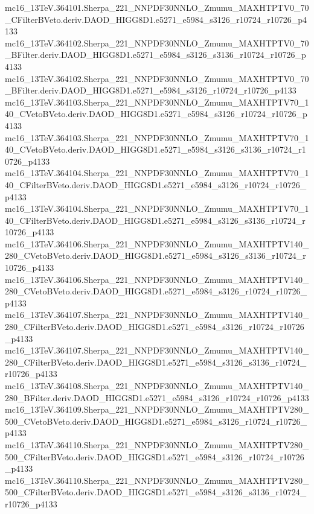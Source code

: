 mc16_13TeV.364101.Sherpa_221_NNPDF30NNLO_Zmumu_MAXHTPTV0_70_CFilterBVeto.deriv.DAOD_HIGG8D1.e5271_e5984_s3126_r10724_r10726_p4133 \\
mc16_13TeV.364102.Sherpa_221_NNPDF30NNLO_Zmumu_MAXHTPTV0_70_BFilter.deriv.DAOD_HIGG8D1.e5271_e5984_s3126_s3136_r10724_r10726_p4133 \\
mc16_13TeV.364102.Sherpa_221_NNPDF30NNLO_Zmumu_MAXHTPTV0_70_BFilter.deriv.DAOD_HIGG8D1.e5271_e5984_s3126_r10724_r10726_p4133 \\
mc16_13TeV.364103.Sherpa_221_NNPDF30NNLO_Zmumu_MAXHTPTV70_140_CVetoBVeto.deriv.DAOD_HIGG8D1.e5271_e5984_s3126_r10724_r10726_p4133 \\
mc16_13TeV.364103.Sherpa_221_NNPDF30NNLO_Zmumu_MAXHTPTV70_140_CVetoBVeto.deriv.DAOD_HIGG8D1.e5271_e5984_s3126_s3136_r10724_r10726_p4133 \\
mc16_13TeV.364104.Sherpa_221_NNPDF30NNLO_Zmumu_MAXHTPTV70_140_CFilterBVeto.deriv.DAOD_HIGG8D1.e5271_e5984_s3126_r10724_r10726_p4133 \\
mc16_13TeV.364104.Sherpa_221_NNPDF30NNLO_Zmumu_MAXHTPTV70_140_CFilterBVeto.deriv.DAOD_HIGG8D1.e5271_e5984_s3126_s3136_r10724_r10726_p4133 \\
mc16_13TeV.364106.Sherpa_221_NNPDF30NNLO_Zmumu_MAXHTPTV140_280_CVetoBVeto.deriv.DAOD_HIGG8D1.e5271_e5984_s3126_s3136_r10724_r10726_p4133 \\
mc16_13TeV.364106.Sherpa_221_NNPDF30NNLO_Zmumu_MAXHTPTV140_280_CVetoBVeto.deriv.DAOD_HIGG8D1.e5271_e5984_s3126_r10724_r10726_p4133 \\
mc16_13TeV.364107.Sherpa_221_NNPDF30NNLO_Zmumu_MAXHTPTV140_280_CFilterBVeto.deriv.DAOD_HIGG8D1.e5271_e5984_s3126_r10724_r10726_p4133 \\
mc16_13TeV.364107.Sherpa_221_NNPDF30NNLO_Zmumu_MAXHTPTV140_280_CFilterBVeto.deriv.DAOD_HIGG8D1.e5271_e5984_s3126_s3136_r10724_r10726_p4133 \\
mc16_13TeV.364108.Sherpa_221_NNPDF30NNLO_Zmumu_MAXHTPTV140_280_BFilter.deriv.DAOD_HIGG8D1.e5271_e5984_s3126_r10724_r10726_p4133 \\
mc16_13TeV.364109.Sherpa_221_NNPDF30NNLO_Zmumu_MAXHTPTV280_500_CVetoBVeto.deriv.DAOD_HIGG8D1.e5271_e5984_s3126_r10724_r10726_p4133 \\
mc16_13TeV.364110.Sherpa_221_NNPDF30NNLO_Zmumu_MAXHTPTV280_500_CFilterBVeto.deriv.DAOD_HIGG8D1.e5271_e5984_s3126_r10724_r10726_p4133 \\
mc16_13TeV.364110.Sherpa_221_NNPDF30NNLO_Zmumu_MAXHTPTV280_500_CFilterBVeto.deriv.DAOD_HIGG8D1.e5271_e5984_s3126_s3136_r10724_r10726_p4133 \\
